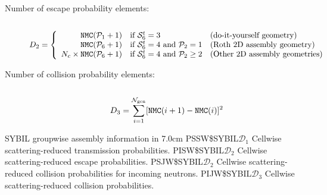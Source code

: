 \begin{description}
\item[Number of escape probability elements:] $~$

\begin{displaymath}
D_2 = \left\{
\begin{array}{rll}
{\tt NMC}(\mathcal{P}_1+1) & \textrm{if~} \mathcal{S}_6^t=3 & \textrm{(do-it-yourself geometry)} \\
{\tt NMC}(\mathcal{P}_6+1) & \textrm{if~} \mathcal{S}_6^t=4 \textrm{~and~} {\mathcal{P}_2=1} & \textrm{(Roth 2D assembly geometry)} \\
N_c \times {\tt NMC}(\mathcal{P}_6+1) & \textrm{if~} \mathcal{S}_6^t=4 \textrm{~and~}
{\mathcal{P}_2\ge 2} & \textrm{(Other 2D assembly geometries)} \\
\end{array} \right.
\end{displaymath}

\item[Number of collision probability elements:] $~$

\begin{displaymath}
D_3 = \sum\limits_{i=1}^{\mathcal{N}_{\rm gen}}[{\tt NMC}(i+1)-{\tt NMC}(i)]^2
\end{displaymath}

\end{description}

\begin{DescriptionEnregistrement}{SYBIL groupwise assembly information in }{7.0cm}
\RealEnr
  {PSSW\$SYBIL}{$\mathcal{D}_1$}{}
  {Cellwise scattering-reduced transmission probabilities.}
\RealEnr
  {PISW\$SYBIL}{$\mathcal{D}_2$}{}
  {Cellwise scattering-reduced escape probabilities.}
\RealEnr
  {PSJW\$SYBIL}{$\mathcal{D}_2$}{}
  {Cellwise scattering-reduced collision probabilities for incoming neutrons.}
\RealEnr
  {PIJW\$SYBIL}{$\mathcal{D}_3$}{}
  {Cellwise scattering-reduced collision probabilities.}
\end{DescriptionEnregistrement}

\eject
